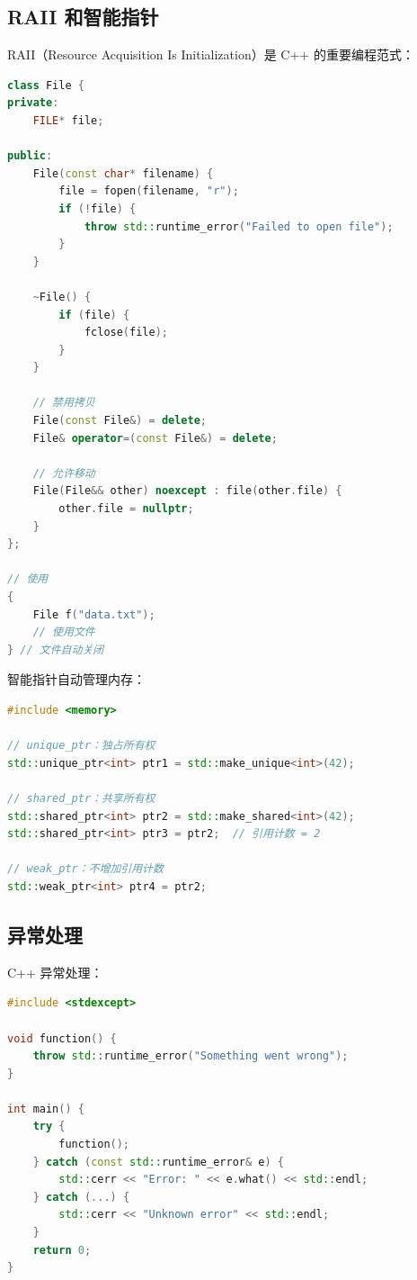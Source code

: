 \subsection{RAII 和智能指针}


RAII（Resource Acquisition Is Initialization）是 C++ 的重要编程范式：

\begin{lstlisting}[language=C++]
class File {
private:
    FILE* file;

public:
    File(const char* filename) {
        file = fopen(filename, "r");
        if (!file) {
            throw std::runtime_error("Failed to open file");
        }
    }

    ~File() {
        if (file) {
            fclose(file);
        }
    }

    // 禁用拷贝
    File(const File&) = delete;
    File& operator=(const File&) = delete;

    // 允许移动
    File(File&& other) noexcept : file(other.file) {
        other.file = nullptr;
    }
};

// 使用
{
    File f("data.txt");
    // 使用文件
} // 文件自动关闭
\end{lstlisting}

智能指针自动管理内存：
\begin{lstlisting}[language=C++]
#include <memory>

// unique_ptr：独占所有权
std::unique_ptr<int> ptr1 = std::make_unique<int>(42);

// shared_ptr：共享所有权
std::shared_ptr<int> ptr2 = std::make_shared<int>(42);
std::shared_ptr<int> ptr3 = ptr2;  // 引用计数 = 2

// weak_ptr：不增加引用计数
std::weak_ptr<int> ptr4 = ptr2;
\end{lstlisting}

\subsection{异常处理}


C++ 异常处理：

\begin{lstlisting}[language=C++]
#include <stdexcept>

void function() {
    throw std::runtime_error("Something went wrong");
}

int main() {
    try {
        function();
    } catch (const std::runtime_error& e) {
        std::cerr << "Error: " << e.what() << std::endl;
    } catch (...) {
        std::cerr << "Unknown error" << std::endl;
    }
    return 0;
}
\end{lstlisting}

